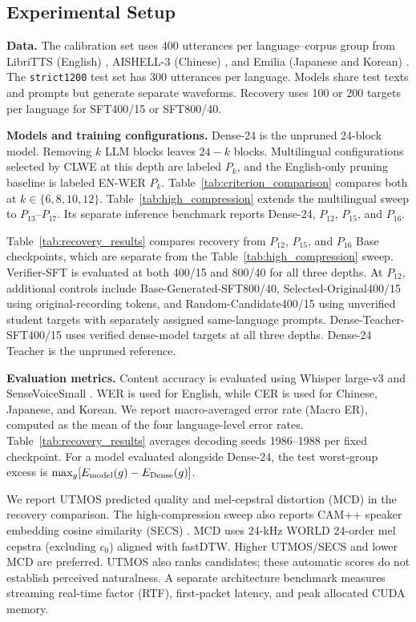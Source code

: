 \documentclass{article}
\begin{document}
\subsection{Experimental Setup}
\label{sec:setup}

\noindent\textbf{Data.}
The calibration set uses 400 utterances per language--corpus group from LibriTTS
(English) \cite{zen2019libritts}, AISHELL-3 (Chinese)
\cite{shi2021aishell3}, and Emilia (Japanese and Korean)
\cite{he2025emilia}. The \texttt{strict1200} test set has 300 utterances
per language. Models share test texts and prompts but generate separate
waveforms. Recovery uses 100 or 200 targets per language for
SFT400/15 or SFT800/40.

\noindent\textbf{Models and training configurations.}
Dense-24 is the unpruned 24-block model. Removing \(k\) LLM blocks
leaves \(24-k\) blocks. Multilingual configurations selected by CLWE
at this depth are labeled \(P_k\), and the English-only pruning
baseline is labeled EN-WER \(P_k\).
Table~\ref{tab:criterion_comparison} compares both at
\(k\in\{6,8,10,12\}\). Table~\ref{tab:high_compression} extends the
multilingual sweep to \(P_{13}\)--\(P_{17}\). Its separate inference
benchmark reports Dense-24, \(P_{12}\), \(P_{15}\), and \(P_{16}\).

Table~\ref{tab:recovery_results} compares recovery from \(P_{12}\),
\(P_{15}\), and \(P_{16}\) Base checkpoints, which are separate from
the Table~\ref{tab:high_compression} sweep. Verifier-SFT
is evaluated at both 400/15 and 800/40 for all three depths. At
\(P_{12}\), additional controls include Base-Generated-SFT800/40,
Selected-Original400/15 using original-recording tokens, and
Random-Candidate400/15 using unverified student targets with
separately assigned same-language prompts. Dense-Teacher-SFT400/15
uses verified dense-model targets at all three depths. Dense-24
Teacher is the unpruned reference.

\noindent\textbf{Evaluation metrics.}
Content accuracy is evaluated using Whisper large-v3
\cite{radford2023whisper} and SenseVoiceSmall
\cite{an2024funaudiollm}. WER is used for English, while CER is used for Chinese,
Japanese, and Korean. We report macro-averaged error rate (Macro ER),
computed as the mean of the four language-level error rates.
Table~\ref{tab:recovery_results} averages decoding seeds 1986--1988
per fixed checkpoint.
For a model
evaluated alongside Dense-24, the test worst-group excess is
$\max_g[E_{\rm model}(g)-E_{\rm Dense}(g)]$.

We report UTMOS predicted quality \cite{saeki2022utmos} and
mel-cepstral distortion (MCD) in the recovery comparison. The
high-compression sweep also reports CAM++ speaker embedding cosine
similarity (SECS) \cite{wang2023campp}. MCD uses 24-kHz WORLD
24-order mel cepstra (excluding $c_0$) aligned with fastDTW.
Higher UTMOS/SECS and lower MCD are preferred. UTMOS also ranks candidates; these automatic scores do not establish perceived naturalness.
A separate architecture benchmark measures
streaming real-time factor (RTF), first-packet latency, and peak allocated CUDA memory.
\end{document}
